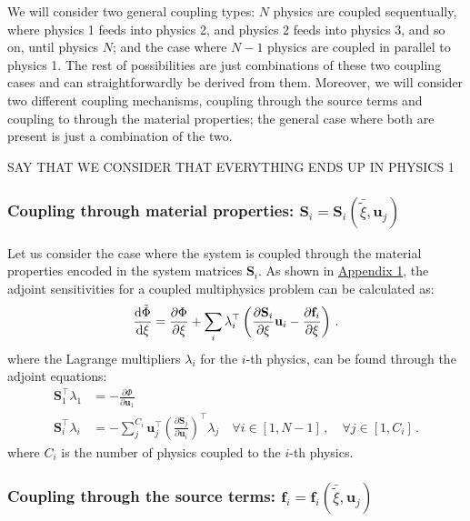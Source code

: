 We will consider two  general coupling types: $N$ physics are coupled sequentually, where physics 1 feeds into physics 2, and physics 2 
feeds into physics 3, and so on, until physics $N$; and the case where $N-1$ physics are coupled in parallel to physics 1. The rest of possibilities are just 
combinations of these two coupling cases and can straightforwardly be derived from them. Moreover, we will consider two different coupling mechanisms,
coupling through the source terms and coupling to through the material properties; the general case where both are present is just a combination of the two.

SAY THAT WE CONSIDER THAT EVERYTHING ENDS UP IN PHYSICS 1

\subsubsection*{Coupling through material properties: $\mathbf{S}_i = \mathbf{S}_i(\bar{\tilde{\xi}}, \mathbf{u}_j)$}

Let us consider the case where the system is coupled through the material properties encoded in the system
matrices $\mathbf{S}_i$. As shown in \hyperref[app:appendix1]{Appendix 1}, the adjoint sensitivities for a coupled multiphysics problem can be calculated as:
\begin{equation}
    \frac{\mathop{}\!\text{d} \tilde{\Phi}}{\mathop{}\!\text{d} \xi} = \frac{\partial \Phi}{\partial \xi} + \sum_i \lambda_{i}^{\top} \left( \frac{\partial \mathbf{S}_i}{\partial \xi} \mathbf{u}_i - \frac{\partial \mathbf{f}_i}{\partial \xi} \right)\,.
\end{equation}
where the Lagrange multipliers $\lambda_i$ for the $i$-th physics, can be found through the adjoint equations:
\begin{align}
    \mathbf{S}^\top_{1}\lambda_{1} &= - \frac{\partial \Phi}{\partial \mathbf{u}_{1}}\,\\
    \mathbf{S}^\top_{i}\lambda_{i} &= - \sum^{C_i}_j \mathbf{u}^\top_j \left(\frac{\partial \mathbf{S}_j}{\partial \mathbf{u}_{i}}\right)^\top \lambda_j \quad \forall i \in [1, N-1]\, , \quad \forall j \in [1, C_i] \,.
\end{align}
where $C_i$ is the number of physics coupled to the $i$-th physics.




\subsubsection*{Coupling through the source terms: $\mathbf{f}_i = \mathbf{f}_i(\bar{\tilde{\xi}}, \mathbf{u}_j)$}


